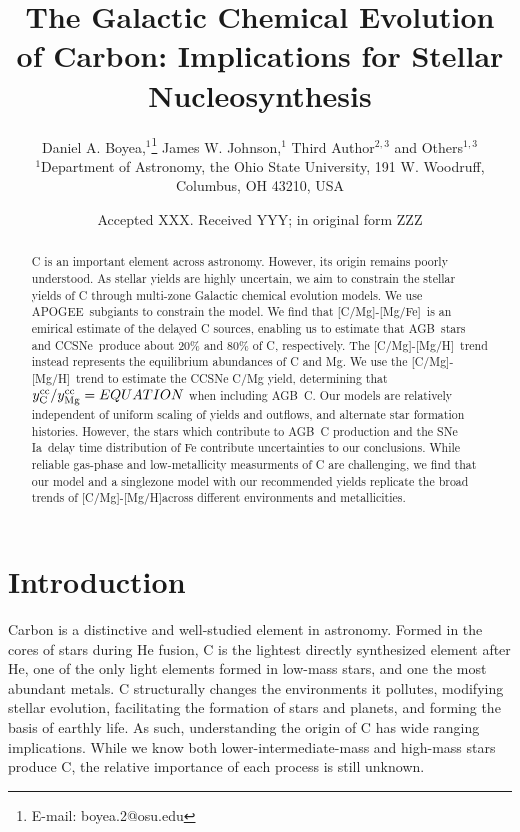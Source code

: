 \documentclass[fleqn,usenatbib]{mnras}
\title[The Origin and Galactic Evolution of Carbon]{The Galactic Chemical Evolution of Carbon: Implications for Stellar Nucleosynthesis }
\author[D. A. Boyea et. al.]{
Daniel A. Boyea,$^{1}$\thanks{E-mail: boyea.2@osu.edu}
James W. Johnson,$^{1}$
Third Author$^{2,3}$
and Others$^{1,3}$
\\
$^{1}$Department of Astronomy, the Ohio State University, 191 W. Woodruff, Columbus, OH 43210, USA
}
\date{Accepted XXX. Received YYY; in original form ZZZ}
\newcommand{\agb}{AGB}
\newcommand{\apogee}{APOGEE}
\newcommand{\cc}{CCSNe}
\newcommand{\ia}{SNe Ia}
\newcommand{\caah}{[C/Mg]-[Mg/H]}
\newcommand{\caafe}{[C/Mg]-[Mg/Fe]}
\newcommand{\Ycc}{\ensuremath{y_{\rm C}^{\rm cc}}}
\newcommand{\Yoc}{\ensuremath{y_{\rm Mg}^{\rm cc}}}
\begin{document}
\label{firstpage}
\pagerange{\pageref{firstpage}--\pageref{lastpage}}
\maketitle



\begin{abstract}
C is an important element across astronomy. However, its origin remains poorly understood. 
% 
As stellar yields are highly uncertain, we aim to constrain the stellar yields of C through multi-zone Galactic chemical evolution models. 
We use \apogee\ subgiants to constrain the model. 
% 
We find that \caafe\ is an emirical estimate of the delayed C sources, enabling us to estimate that \agb\ stars and \cc\ produce about 20\% and 80\% of C, respectively.  
The \caah\ trend instead represents the equilibrium abundances of C and Mg. 
We use the \caah\ trend to estimate the CCSNe C/Mg yield, determining that  $\Ycc/\Yoc = EQUATION$ when including \agb\ C. 
Our models are relatively independent of uniform scaling of yields and outflows, and alternate star formation histories. 
However, the stars which contribute to \agb\ C production and the \ia\ delay time distribution of Fe contribute uncertainties to our conclusions. 
While reliable gas-phase and low-metallicity measurments of C are challenging, we find that our model and a singlezone model with our recommended yields replicate the broad trends of \caah across different environments and metallicities. 

\end{abstract}







\section{Introduction}

Carbon is a distinctive and well-studied element in astronomy. 
Formed in the cores of stars during He fusion, C is the lightest directly synthesized element after He, one of the only light elements formed in low-mass stars, and one the most abundant metals\footnotemark{}. %
C structurally changes the environments it pollutes, modifying stellar evolution, facilitating the formation of stars and planets, and forming the basis of earthly life.
As such, understanding the origin of C has wide ranging implications. 
While we know both lower-intermediate-mass and high-mass stars produce C, the relative importance of each process is still unknown.
\end{document}
